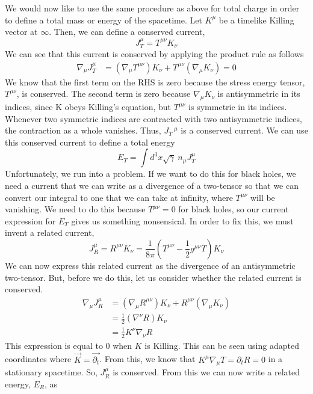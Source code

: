 \documentclass[11pt,table]{article}
\begin{document}
We would now like to use the same procedure as above for total charge in order to define a total mass or energy of the spacetime. Let $K^\mu$ be a timelike Killing vector at $\infty$. Then, we can define a conserved current, 
\begin{equation}
    J_T^\mu = T^{\mu\nu} K_\nu
\end{equation}
We can see that this current is conserved by applying the product rule as follows
\begin{align*}
    \nabla_\mu J_T^\mu &= (\nabla_\mu T^{\mu\nu})K_\nu + T^{\mu\nu}(\nabla_\mu K_\nu) = 0
\end{align*}
We know that the first term on the RHS is zero because the stress energy tensor, $T^{\mu\nu}$, is conserved. The second term is zero because $\nabla_\mu K_\nu$ is antisymmetric in its indices, since K obeys Killing's equation, but $T^{\mu\nu}$ is symmetric in its indices. Whenever two symmetric indices are contracted with two antisymmetric indices, the contraction as a whole vanishes. Thus, $J_T\,^\mu$ is a conserved current. We can use this conserved current to define a total energy
\begin{equation}
    E_T = \int d^3x\sqrt{\gamma}\:n_\mu J_T^\mu
\end{equation}
Unfortunately, we run into a problem. If we want to do this for black holes, we need a current that we can write as a divergence of a two-tensor so that we can convert our integral to one that we can take at infinity, where $T^{\mu\nu}$ will be vanishing. We need to do this because $T^{\mu\nu} = 0$ for black holes, so our current expression for $E_T$ gives us something nonsensical. In order to fix this, we must invent a related current,
\begin{equation}
    J_R^\mu = R^{\mu\nu} K_\nu = \frac{1}{8\pi}(T^{\mu\nu}-\frac{1}{2}g^{\mu\nu}T)K_\nu
\end{equation}
We can now express this related current as the divergence of an antisymmetric two-tensor. But, before we do this, let us consider whether the related current is conserved.
\begin{align*}
    \nabla_\mu J_R^\mu &= (\nabla_\mu R^{\mu\nu})K_\nu + R^{\mu\nu}(\nabla_\mu K_\nu) \\
    &=\frac{1}{2}(\nabla^\nu R)K_\nu \\
    &=\frac{1}{2}K^\nu\nabla_\nu R 
\end{align*}
This expression is equal to 0 when $K$ is Killing. This can be seen using adapted coordinates where $\vec{K} = \vec{\partial_t}$. From this, we know that $K^\mu\nabla_\mu T = \partial_t R = 0$ in a stationary spacetime. So, $J_R^\mu$ is conserved. From this we can now write a related energy, $E_R$, as
\end{document}
